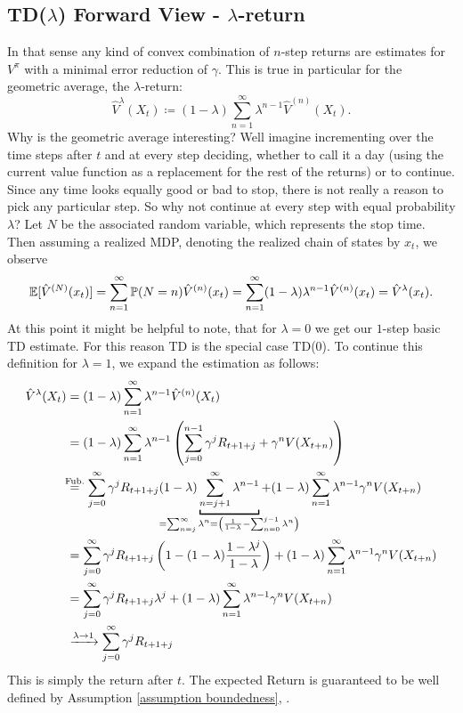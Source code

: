 \subsection{TD(\(\lambda\)) Forward View - \(\lambda\)-return}
In that sense any kind of convex combination of \(n\)-step returns are estimates for \(V^\pi\) with a minimal error reduction of \(\gamma\). This is true in particular for the geometric average, the \(\lambda\)-return:
\[
	\hat{V}^\lambda(X_t)\coloneqq (1-\lambda)\sum_{n=1}^\infty \lambda^{n-1} \hat{V}^{(n)}(X_t).
\]
Why is the geometric average interesting? Well imagine incrementing over the time steps after \(t\) and at every step deciding, whether to call it a day (using the current value function as a replacement for the rest of the returns) or to continue. Since any time looks equally good or bad to stop, there is not really a reason to pick any particular step. So why not continue at every step with equal probability \(\lambda\)? Let \(N\) be the associated random variable, which represents the stop time. Then assuming a realized MDP, denoting the realized chain of states by \(x_t\), we observe
\[
	\mathbb{E}[\hat{V}^{(N)}(x_t)]=\sum_{n=1}^\infty \mathbb{P}(N=n) \hat{V}^{(n)}(x_t) 
	=\sum_{n=1}^\infty (1-\lambda)\lambda^{n-1} \hat{V}^{(n)}(x_t)=\hat{V}^\lambda (x_t).
\]
At this point it might be helpful to note, that for \(\lambda=0\) we get our \(1\)-step basic TD estimate. For this reason TD is the special case TD(\(0\)). To continue this definition for \(\lambda=1\), we expand the estimation as follows:
\begin{align}
	\hat{V}^\lambda(X_t)&=(1-\lambda)\sum_{n=1}^\infty \lambda^{n-1} \hat{V}^{(n)}(X_t)
	\nonumber\\
	&=(1-\lambda)\sum_{n=1}^\infty \lambda^{n-1}
	\left(
		\sum_{j=0}^{n-1}\gamma^j R_{t+1+j} + \gamma^n V(X_{t+n})
	\right)
	\nonumber\\
	&\lxeq{\text{Fub.}}\sum_{j=0}^\infty \gamma^j R_{t+1+j} 
	(1-\lambda)\underbracket[1pt]{\sum_{n=j+1}^\infty \lambda^{n-1}}_{
		\mathclap{=\sum_{n=j}^\infty \lambda^n = \left(\frac{1}{1-\lambda} - \sum_{n=0}^{j-1}\lambda^n\right)}
	}
	+ (1-\lambda) \sum_{n=1}^\infty \lambda^{n-1}\gamma^n V(X_{t+n})
	\nonumber\\
	&=\sum_{j=0}^\infty \gamma^j R_{t+1+j} 
	\left(1- (1-\lambda)\frac{1-\lambda^j}{1-\lambda} \right) 
	+ (1-\lambda)\sum_{n=1}^\infty \lambda^{n-1}\gamma^n V(X_{t+n})
	\nonumber\\
	&=\sum_{j=0}^\infty \gamma^j R_{t+1+j} \lambda^j 
	+ (1-\lambda)\sum_{n=1}^\infty \lambda^{n-1}\gamma^n V(X_{t+n})
	\label{tangent backward view}\\
	&\xrightarrow{\lambda \to 1} \sum_{j=0}^\infty \gamma^j R_{t+1+j}
	\nonumber
\end{align}
This is simply the return after \(t\). The expected Return is guaranteed to be well defined by Assumption \ref{assumption boundedness}, .

